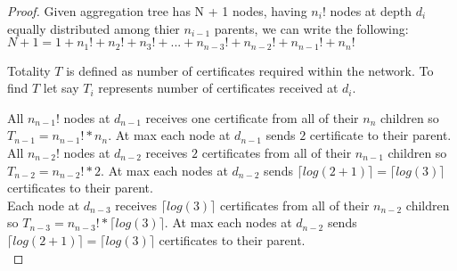 \begin{proof}
	Given aggregation tree has N + 1 nodes, having $n_{i}!$ nodes at depth $d_{i}$ equally distributed among thier $n_{i-1}$ parents, we can write the following:\\
	$ N + 1 = 1 + n_{1}! + n_{2}! + n_{3}! + ... + n_{n - 3}! + n_{n - 2}! + n_{n - 1}! + n_{n}! $

	Totality $T$ is defined as number of certificates required within the network. To find $T$ let say $T_{i}$ represents number of certificates received at $d_{i}$.

	All $ n_{n-1} ! $ nodes at $ d_{n-1} $ receives one certificate from all of their $ n_{n} $ children so $T_{n-1} = n_{n-1} ! * n_{n} $. At max each node at $d_{n-1}$ sends $2$ certificate to their parent.\\

	All $ n_{n-2} ! $ nodes at $ d_{n-2} $ receives $2$ certificates from all of their $ n_{n-1} $ children so $T_{n-2} = n_{n-2} ! * 2 $. At max each nodes at $d_{n-2}$ sends $\lceil log(2 + 1) \rceil = \lceil log(3) \rceil $ certificates to their parent.\\

	Each node at $ d_{n-3} $ receives $\lceil log(3) \rceil$ certificates from all of their $ n_{n-2} $ children so $T_{n-3} = n_{n-3} ! * \lceil log(3) \rceil $. At max each nodes at $d_{n-2}$ sends $\lceil log(2 + 1) \rceil = \lceil log(3) \rceil $ certificates to their parent.\\

\end{proof}